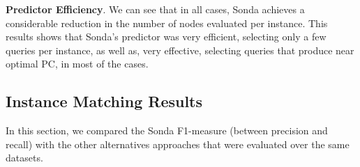 \textbf{Predictor Efficiency}. We can see that in all cases, Sonda achieves a considerable reduction in the number of nodes evaluated per instance. This results shows that Sonda's predictor was very efficient, selecting only a few queries per instance, as well as, very effective, selecting queries that produce near optimal PC, in most of the cases.


\subsection{Instance Matching Results} 

In this section, we compared the Sonda F1-measure (between precision and recall) with the other alternatives approaches that were evaluated over the same datasets.



 

 